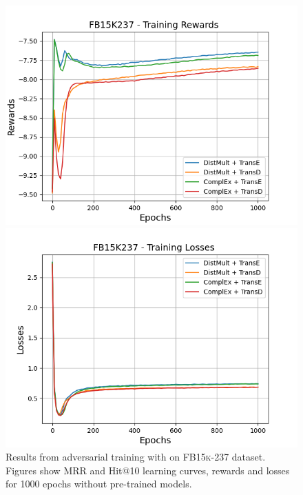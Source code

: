 \begin{figure}
    \begin{minipage}{.5\textwidth}
      \centering
      \includegraphics[width=\linewidth]{figures/results/gan_train/not_pretrained/random/fb15k237/epochs1000/random_fb15k237_rew.png}
    \end{minipage}%
     \begin{minipage}{.5\textwidth}
      \centering
      \includegraphics[width=\linewidth]{figures/results/gan_train/not_pretrained/random/fb15k237/epochs1000/random_fb15k237_losses.png}
    \end{minipage}%
    \caption{Results from adversarial training with \origsampling on \textsc{FB15k-237} dataset.
    Figures show MRR and Hit@10 learning curves, rewards and losses for 1000 epochs without pre-trained models.}
    \label{fig:gan_train_not_pretrained_random_fb15k237}
\end{figure}
